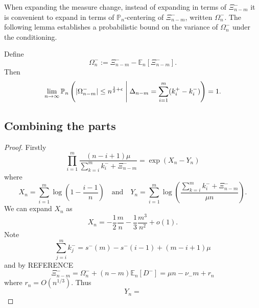 \documentclass[draft]{scrartcl}
\newcommand{\E}{\mathbb E}
\newcommand{\littleo}{o}
\newcommand{\defeq}{:=}
\renewcommand{\Pr}{\mathbb P}
\DeclarePairedDelimiter{\abs}{\lvert}{\rvert}
\begin{document}
When expanding the measure change, instead of expanding in terms of $\Xi^-_{n-m}$ it is convenient to expand in terms of $\Pr_n$-centering of $\Xi^-_{n-m}$, written $\Omega^-_n$. The following lemma establishes a probabilistic bound on the variance of $\Omega^-_n$ under the conditioning.

\begin{lemma}
    Define
    \begin{equation}
        \Omega_n^- \defeq \Xi^-_{n-m} - \E_n\left[ \Xi^-_{n-m} \right].
    \end{equation}
    Then
    \begin{equation}
        \lim_{n \to \infty} \Pr_n\left( \abs{\Omega^-_{n-m}} \leq n^{\frac{1}{2} + \epsilon} \Biggm| \Delta_{n-m} = \sum_{i=1}^m (k^+_i - k^-_i) \right) = 1.
    \end{equation}
\end{lemma}

\subsection{Combining the parts}

\begin{proof}
    Firstly
    \begin{equation}
        \prod_{i=1}^m \frac{(n-i+1)\mu}{\sum_{k=i}^m k^-_i + \Xi^-_{n-m}} = \exp(X_n - Y_n)
    \end{equation}
    where
    \begin{equation}
        X_n = \sum_{i=1}^m \log\left( 1 - \frac{i-1}{n} \right)
        \quad \text{and} \quad
        Y_n = \sum_{i=1}^m \log\left( \frac{\sum_{k=i}^m k_i^- + \Xi^-_{n-m}}{\mu n} \right).
    \end{equation}
    We can expand $X_n$ as
    \begin{equation}
        X_n = - \frac{1}{2} \frac{m}{n} - \frac{1}{3} \frac{m^3}{n^2} + \littleo(1).
    \end{equation}
    Note
    \begin{equation}
        \sum_{j=i}^m k^-_j = s^-(m) - s^-(i - 1) + (m - i + 1) \mu
    \end{equation}
    and by REFERENCE
    \begin{equation}
        \Xi^-_{n-m} = \Omega^-_n + (n - m) \E_n[D^-] = \mu n - \nu_- m + r_n
    \end{equation}
    where $r_n = O(n^{1/3})$. Thus
    \begin{equation}
        Y_n = 
    \end{equation}
\end{proof}

\printbibliography
\end{document}
